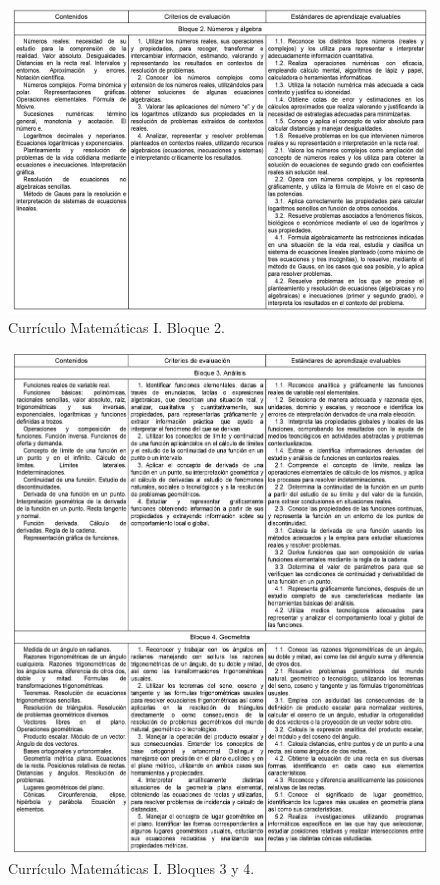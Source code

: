 \documentclass[a4paper, openright, 11pt, titlepage]{report}
\theoremstyle{definition}\newtheorem{defin}[propo]{Definition}
\theoremstyle{definition}\newtheorem{obser}[propo]{Remark}
\theoremstyle{definition}\newtheorem{ejem}[propo]{Ejemplo}
\theoremstyle{definition}\newtheorem{algoritmo}[propo]{Algoritmo}
\begin{document}
  \begin{figure}[H]
     \centering
     \includegraphics[width = 1.1\textwidth]{Images/Apéndices/Apéndice B/curriculo2.png}
     \caption{Currículo Matemáticas I. Bloque 2.}
 \end{figure}
  \begin{figure}[H]
     \centering
     \includegraphics[width = 1.1\textwidth]{Images/Apéndices/Apéndice B/curriculo3.png}
     \caption{Currículo Matemáticas I. Bloques 3 y 4.}
 \end{figure}
\end{document}
